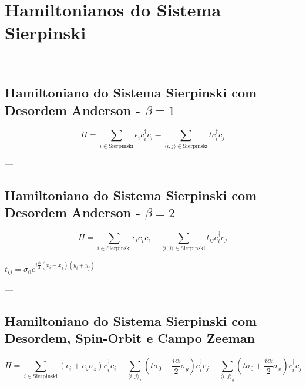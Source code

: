 \documentclass{article}
\begin{document}
	
	\section*{Hamiltonianos do Sistema Sierpinski}
	
	---
	\subsection*{Hamiltoniano do Sistema Sierpinski com Desordem Anderson - $\beta=1$}
	\begin{equation}
		H=\sum_{i\in \text{Sierpinski}}\epsilon_{i}c_{i}^{\dagger}c_{i}-\sum_{\langle i,j\rangle\in \text{Sierpinski}}tc_{i}^{\dagger}c_{j}
	\end{equation}
	
	---
	\subsection*{Hamiltoniano do Sistema Sierpinski com Desordem Anderson - $\beta=2$}
	\begin{equation}
		H=\sum_{i\in \text{Sierpinski}}\epsilon_{i}c_{i}^{\dagger}c_{i}-\sum_{\langle i,j\rangle\in \text{Sierpinski}}t_{ij}c_{i}^{\dagger}c_{j}
	\end{equation}
	
	$t_{ij}=\sigma_{0}e^{i\frac{\phi}{2}(x_{i}-x_{j})(y_{i}+y_{j})}$
	
	---
	\subsection*{Hamiltoniano do Sistema Sierpinski com Desordem, Spin-Orbit e Campo Zeeman}
	\begin{equation}
		H=\sum_{i\in \text{Sierpinski}}(\epsilon_{i}+e_{z}\sigma_{z})c_{i}^{\dagger}c_{i}-\sum_{\langle i,j\rangle_{x}}(t\sigma_{0}-\frac{i\alpha}{2}\sigma_{y})c_{i}^{\dagger}c_{j}-\sum_{\langle i,j\rangle_{y}}(t\sigma_{0}+\frac{i\alpha}{2}\sigma_{x})c_{i}^{\dagger}c_{j}
	\end{equation}
	
\end{document}
